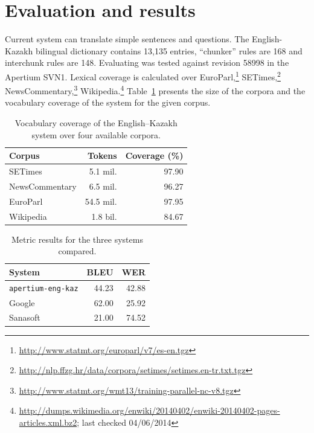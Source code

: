 \documentclass[11pt]{article}
\begin{document}
\section{Evaluation and results}

Current system can translate simple sentences and questions. The English-Kazakh bilingual dictionary 
contains 13,135 entries, ``chunker'' rules are 168 and interchunk rules are 148. 
Evaluating was tested against  revision 58998 in the Apertium SVN1. Lexical coverage is calculated 
over EuroParl,\footnote{\url{http://www.statmt.org/europarl/v7/es-en.tgz}} SETimes,\footnote{\url{http://nlp.ffzg.hr/data/corpora/setimes/setimes.en-tr.txt.tgz}} NewsCommentary,\footnote{\url{http://www.statmt.org/wmt13/training-parallel-nc-v8.tgz}} Wikipedia.\footnote{\url{http://dumps.wikimedia.org/enwiki/20140402/enwiki-20140402-pages-articles.xml.bz2}; last checked 04/06/2014} 
Table~\ref{table:coverage} presents the size of the corpora and the vocabulary coverage of the system for the given corpus.

\begin{table}
  \centering
  \begin{tabular}{|l|r|r|}
    \hline
    \textbf{Corpus} & \textbf{Tokens} & \textbf{Coverage} (\%) \\
    \hline
    SETimes & 5.1 mil. & 97.90 \\
    NewsCommentary & 6.5 mil. & 96.27 \\
    EuroParl & 54.5 mil. & 97.95 \\
    Wikipedia & 1.8 bil. & 84.67 \\
    \hline
  \end{tabular}
  \caption{Vocabulary coverage of the English--Kazakh system over four available corpora.}
  \label{table:coverage}
\end{table}

\begin{table}
  \centering
  \begin{tabular}{|l|r|r|}
    \hline
    \textbf{System} & \textbf{BLEU} & \textbf{WER} \\
    \hline
    \texttt{apertium-eng-kaz} & 44.23 & 42.88 \\
    Google & 62.00 & 25.92 \\
    Sanasoft & 21.00 & 74.52 \\
    \hline
  \end{tabular}
  \caption{Metric results for the three systems compared.}
  \label{table:metrics}
\end{table}
\end{document}
